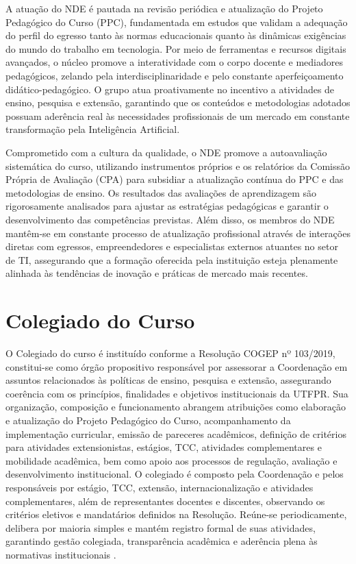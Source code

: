 A atuação do NDE é pautada na revisão periódica e atualização do Projeto Pedagógico do Curso (PPC), fundamentada em estudos que validam a adequação do perfil do egresso tanto às normas educacionais quanto às dinâmicas exigências do mundo do trabalho em tecnologia. Por meio de ferramentas e recursos digitais avançados, o núcleo promove a interatividade com o corpo docente e mediadores pedagógicos, zelando pela interdisciplinaridade e pelo constante aperfeiçoamento didático-pedagógico. O grupo atua proativamente no incentivo a atividades de ensino, pesquisa e extensão, garantindo que os conteúdos e metodologias adotados possuam aderência real às necessidades profissionais de um mercado em constante transformação pela Inteligência Artificial.

Comprometido com a cultura da qualidade, o NDE promove a autoavaliação sistemática do curso, utilizando instrumentos próprios e os relatórios da Comissão Própria de Avaliação (CPA) \cite{UTFPR_CPA_2004, UTFPR_CPA_2009} para subsidiar a atualização contínua do PPC e das metodologias de ensino. Os resultados das avaliações de aprendizagem são rigorosamente analisados para ajustar as estratégias pedagógicas e garantir o desenvolvimento das competências previstas. Além disso, os membros do NDE mantêm-se em constante processo de atualização profissional através de interações diretas com egressos, empreendedores e especialistas externos atuantes no setor de TI, assegurando que a formação oferecida pela instituição esteja plenamente alinhada às tendências de inovação e práticas de mercado mais recentes.

\section{Colegiado do Curso}

O Colegiado do curso é instituído conforme a Resolução COGEP nº 103/2019, constitui-se como órgão propositivo responsável por assessorar a Coordenação em assuntos relacionados às políticas de ensino, pesquisa e extensão, assegurando coerência com os princípios, finalidades e objetivos institucionais da UTFPR. Sua organização, composição e funcionamento abrangem atribuições como elaboração e atualização do Projeto Pedagógico do Curso, acompanhamento da implementação curricular, emissão de pareceres acadêmicos, definição de critérios para atividades extensionistas, estágios, TCC, atividades complementares e mobilidade acadêmica, bem como apoio aos processos de regulação, avaliação e desenvolvimento institucional. O colegiado é composto pela Coordenação e pelos responsáveis por estágio, TCC, extensão, internacionalização e atividades complementares, além de representantes docentes e discentes, observando os critérios eletivos e mandatários definidos na Resolução. Reúne-se periodicamente, delibera por maioria simples e mantém registro formal de suas atividades, garantindo gestão colegiada, transparência acadêmica e aderência plena às normativas institucionais \cite{UTFPR_Colegiado_2019}.

